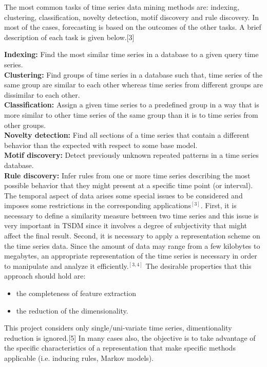 \documentclass[12pt,a4paper]{report}
\begin{document}
The most common tasks of time series data mining methods are: indexing, clustering, classification, novelty detection, motif discovery and rule discovery. In most of the cases, forecasting is based on the outcomes of the other tasks. A brief description of each task is given below.[3]

\noindent
\textbf{Indexing:} Find the most similar time series in a database to a given query time series.\\
\textbf{Clustering:} Find groups of time series in a database such that, time series of the same group are similar to each other whereas time series from different groups are dissimilar to each other.\\
\textbf{Classification:} Assign a given time series to a predefined group in a way that is more similar to other time series of the same group than it is to time series from other groups.\\
\textbf{Novelty detection:} Find all sections of a time series that contain a different behavior than the expected with respect to some base model.\\
\textbf{Motif discovery:} Detect previously unknown repeated patterns in a time series database.\\
\textbf{Rule discovery:} Infer rules from one or more time series describing the most possible behavior that they might present at a specific time point (or interval).\\


  The temporal aspect of data arises some special issues to be considered and imposes some restrictions in the corresponding applications$^{[3]}$. First, it is necessary to define a similarity measure between two time series and this issue is very important in TSDM since it involves a degree of subjectivity that might affect the final result. Second, it is necessary to apply a representation scheme on the time series data. Since the amount of data may range from a few kilobytes to megabytes, an appropriate representation of the time series is necessary in order to manipulate and analyze it efficiently.$^{[3,4]}$ The desirable properties that this approach should hold are: 
  \begin{itemize}
  \item the completeness of feature extraction 
  \item the reduction of the dimensionality. 
  \end{itemize}

This project  considers only single/uni-variate time series, dimentionality reduction is ignored.[5]
In many cases also, the objective is to take advantage of the specific characteristics of a representation that make specific methods applicable (i.e. inducing rules, Markov models). 
\end{document}
